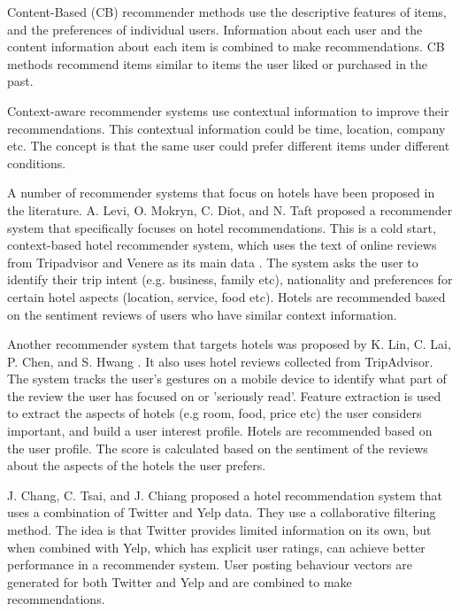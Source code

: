Content-Based (CB) recommender methods use the descriptive features of items, and the preferences of individual users. Information about each user and the content information about each item is combined to make recommendations. CB methods recommend items similar to items the user liked or purchased in the past.

Context-aware recommender systems use contextual information to improve their recommendations. This contextual information could be time, location, company etc. The concept is that the same user could prefer different items under different conditions.

A number of recommender systems that focus on hotels have been proposed in the literature. A. Levi, O. Mokryn, C. Diot, and N. Taft proposed a recommender system that specifically focuses on hotel recommendations. This is a cold start, context-based hotel recommender system, which uses the text of online reviews from Tripadvisor and Venere as its main data \cite{levi2012}. The system asks the user to identify their trip intent (e.g. business, family etc), nationality and preferences for certain hotel aspects (location, service, food etc). Hotels are recommended based on the sentiment reviews of users who have similar context information.

Another recommender system that targets hotels was proposed by K. Lin, C. Lai, P. Chen, and S. Hwang \cite{lin2015}. It also uses hotel reviews collected from TripAdvisor. The system tracks the user's gestures on a mobile device to identify what part of the review the user has focused on or 'seriously read'. Feature extraction is used to extract the aspects of hotels (e.g room, food, price etc) the user considers important, and build a user interest profile. Hotels are recommended based on the user profile. The score is calculated based on the sentiment of the reviews about the aspects of the hotels the user prefers.

J. Chang, C. Tsai, and J. Chiang \cite{chang2018} proposed a hotel recommendation system that uses a combination of Twitter and Yelp data. They use a collaborative filtering method. The idea is that Twitter provides limited information on its own, but when combined with Yelp, which has explicit user ratings, can achieve better performance in a recommender system. User posting behaviour vectors are generated for both Twitter and Yelp and are combined to make recommendations.

